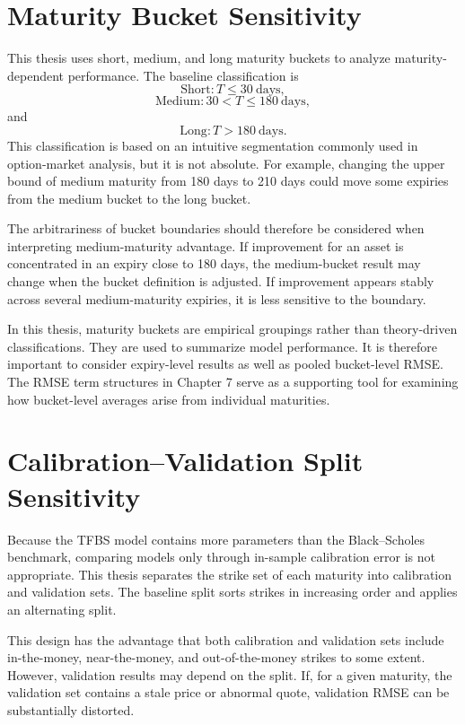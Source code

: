 \documentclass[11pt,a4paper]{report}
\begin{document}
\section{Maturity Bucket Sensitivity}

This thesis uses short, medium, and long maturity buckets to analyze maturity-dependent performance. The baseline classification is
\[
\text{Short}: T\le 30\ \text{days},
\]
\[
\text{Medium}: 30<T\le 180\ \text{days},
\]
and
\[
\text{Long}: T>180\ \text{days}.
\]
This classification is based on an intuitive segmentation commonly used in option-market analysis, but it is not absolute. For example, changing the upper bound of medium maturity from 180 days to 210 days could move some expiries from the medium bucket to the long bucket.

The arbitrariness of bucket boundaries should therefore be considered when interpreting medium-maturity advantage. If improvement for an asset is concentrated in an expiry close to 180 days, the medium-bucket result may change when the bucket definition is adjusted. If improvement appears stably across several medium-maturity expiries, it is less sensitive to the boundary.

In this thesis, maturity buckets are empirical groupings rather than theory-driven classifications. They are used to summarize model performance. It is therefore important to consider expiry-level results as well as pooled bucket-level RMSE. The RMSE term structures in Chapter 7 serve as a supporting tool for examining how bucket-level averages arise from individual maturities.

\section{Calibration--Validation Split Sensitivity}

Because the TFBS model contains more parameters than the Black--Scholes benchmark, comparing models only through in-sample calibration error is not appropriate. This thesis separates the strike set of each maturity into calibration and validation sets. The baseline split sorts strikes in increasing order and applies an alternating split.

This design has the advantage that both calibration and validation sets include in-the-money, near-the-money, and out-of-the-money strikes to some extent. However, validation results may depend on the split. If, for a given maturity, the validation set contains a stale price or abnormal quote, validation RMSE can be substantially distorted.
\end{document}
